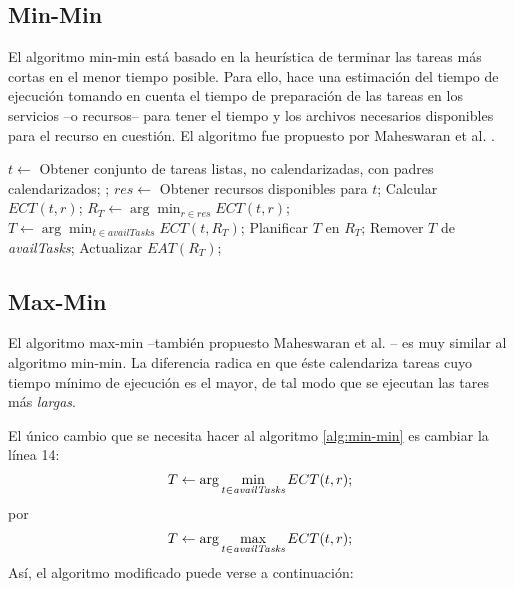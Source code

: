 \subsection{Min-Min}
El algoritmo min-min está basado en la heurística de terminar las tareas más cortas en el menor tiempo posible. Para ello, hace una estimación del tiempo de ejecución tomando en cuenta el tiempo de preparación de las tareas en los servicios --o recursos-- para tener el tiempo y los archivos necesarios disponibles para el recurso en cuestión. El algoritmo fue propuesto por Maheswaran et al. \cite{maheswaran1999dynamic}. 

\label{alg:min-min}
\begin{algorithmic}[1]
	\State $t \gets$ Obtener conjunto de tareas listas, no calendarizadas, con padres  calendarizados;
	\State {};
\EndWhile
{}
			\State $res \gets$ Obtener recursos disponibles para $t$;
				\State Calcular $ECT(t,r)$;
			\EndFor
			\State $R_T \gets \arg\min_{r \in res}ECT(t,r)$;
		\EndFor
		\State $T \gets \arg\min_{t \in availTasks}ECT(t,R_T)$;
		\State Planificar $T$ en $R_T$;
		\State Remover $T$ de \emph{availTasks};
		\State Actualizar $EAT(R_T)$;
	\EndWhile
\EndProcedure
\end{algorithmic}

\subsection{Max-Min}
El algoritmo max-min --también propuesto Maheswaran et al. \cite{maheswaran1999dynamic}-- es muy similar al algoritmo min-min. La diferencia radica en que éste calendariza tareas cuyo tiempo mínimo de ejecución es el mayor, de tal modo que se ejecutan las tares más \emph{largas}.

El único cambio que se necesita hacer al algoritmo \ref{alg:min-min} es cambiar la línea 14:
\[T \leftarrow \arg\min_{t \in \emph{availTasks}}ECT(t,r);\]
por
\[T \leftarrow \arg\max_{t \in \emph{availTasks}}ECT(t,r);\]
Así, el algoritmo modificado puede verse a continuación: %

